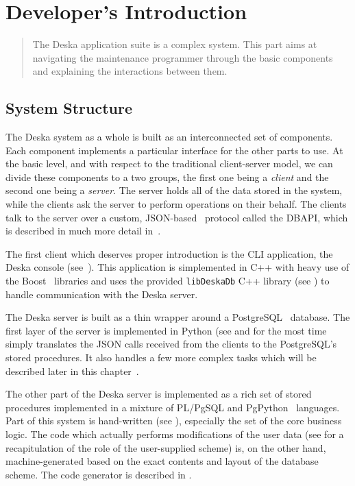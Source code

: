 \documentclass[deska]{subfiles}
\begin{document}
\chapter{Developer's Introduction}
\label{sec:dev-intro}

\begin{abstract}
The Deska application suite is a complex system.  This part aims at navigating the maintenance programmer through the
basic components and explaining the interactions between them.
\end{abstract}

\section{System Structure}
The Deska system as a whole is built as an interconnected set of components.  Each component implements a particular
interface for the other parts to use.  At the basic level, and with respect to the traditional client-server model, we
can divide these components to a two groups, the first one being a {\em client} and the second one being a {\em server}.
The server holds all of the data stored in the system, while the clients ask the server to perform operations on their
behalf.  The clients talk to the server over a custom, JSON-based~\cite{json} protocol called the DBAPI, which is
described in much more detail in~.

The first client which deserves proper introduction is the CLI application, the Deska console
(see~).  This application is simplemented in C++ with heavy use of the Boost~\cite{boost} libraries
and uses the provided {\tt libDeskaDb} C++ library (see ) to handle communication with the Deska
server.

The Deska server is built as a thin wrapper around a PostgreSQL~\cite{postgresql} database.  The first layer of the
server is implemented in Python (see  and for the most time simply translates the JSON calls
received from the clients to the PostgreSQL's stored procedures.  It also handles a few more complex tasks which will be
described later in this chapter~.

The other part of the Deska server is implemented as a rich set of stored procedures implemented in a mixture of
PL/PgSQL and PgPython~\cite{pg-python} languages.  Part of this system is hand-written (see ),
especially the set of the core business logic.  The code which actually performs modifications of the user data (see
 for a recapitulation of the role of the user-supplied scheme) is, on the other hand,
machine-generated based on the exact contents and layout of the database scheme.  The code generator is described in
.
\end{document}
